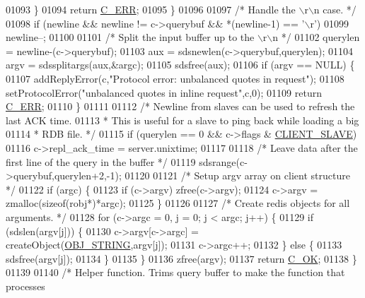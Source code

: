 \begin{DoxyCode}
{{{{{{{{{{{01093         \}
01094         \textcolor{keywordflow}{return} \hyperlink{server_8h_af98ac28d5f4d23d7ed5985188e6fb7d1}{C\_ERR};
01095     \}
01096 
01097     \textcolor{comment}{/* Handle the \(\backslash\)r\(\backslash\)n case. */}
01098     \textcolor{keywordflow}{if} (newline && newline != c->querybuf && *(newline-1) == \textcolor{stringliteral}{'\(\backslash\)r'})
01099         newline--;
01100 
01101     \textcolor{comment}{/* Split the input buffer up to the \(\backslash\)r\(\backslash\)n */}
01102     querylen = newline-(c->querybuf);
01103     aux = sdsnewlen(c->querybuf,querylen);
01104     argv = sdssplitargs(aux,&argc);
01105     sdsfree(aux);
01106     \textcolor{keywordflow}{if} (argv == NULL) \{
01107         addReplyError(c,\textcolor{stringliteral}{"Protocol error: unbalanced quotes in request"});
01108         setProtocolError(\textcolor{stringliteral}{"unbalanced quotes in inline request"},c,0);
01109         \textcolor{keywordflow}{return} \hyperlink{server_8h_af98ac28d5f4d23d7ed5985188e6fb7d1}{C\_ERR};
01110     \}
01111 
01112     \textcolor{comment}{/* Newline from slaves can be used to refresh the last ACK time.}
01113 \textcolor{comment}{     * This is useful for a slave to ping back while loading a big}
01114 \textcolor{comment}{     * RDB file. */}
01115     \textcolor{keywordflow}{if} (querylen == 0 && c->flags & \hyperlink{server_8h_ae9f6995948253652bc9454d79a72f4a7}{CLIENT\_SLAVE})
01116         c->repl\_ack\_time = server.unixtime;
01117 
01118     \textcolor{comment}{/* Leave data after the first line of the query in the buffer */}
01119     sdsrange(c->querybuf,querylen+2,-1);
01120 
01121     \textcolor{comment}{/* Setup argv array on client structure */}
01122     \textcolor{keywordflow}{if} (argc) \{
01123         \textcolor{keywordflow}{if} (c->argv) zfree(c->argv);
01124         c->argv = zmalloc(\textcolor{keyword}{sizeof}(robj*)*argc);
01125     \}
01126 
01127     \textcolor{comment}{/* Create redis objects for all arguments. */}
01128     \textcolor{keywordflow}{for} (c->argc = 0, j = 0; j < argc; j++) \{
01129         \textcolor{keywordflow}{if} (sdslen(argv[j])) \{
01130             c->argv[c->argc] = createObject(\hyperlink{server_8h_a65236ea160f69cdef33ec942092af88f}{OBJ\_STRING},argv[j]);
01131             c->argc++;
01132         \} \textcolor{keywordflow}{else} \{
01133             sdsfree(argv[j]);
01134         \}
01135     \}
01136     zfree(argv);
01137     \textcolor{keywordflow}{return} \hyperlink{server_8h_a303769ef1065076e68731584e758d3e1}{C\_OK};
01138 \}
01139 
01140 \textcolor{comment}{/* Helper function. Trims query buffer to make the function that processes}
}}}}}}}}}}}
\end{DoxyCode}
